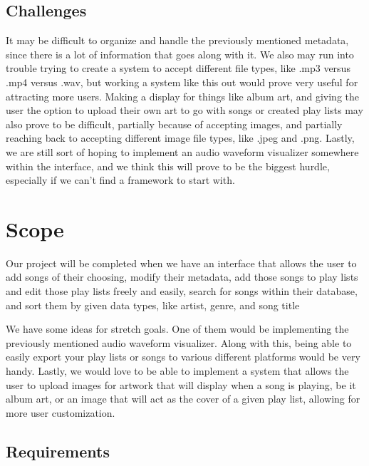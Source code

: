 \documentclass[10pt,conference,onecolumn,compsoc]{IEEEtran}
\begin{document}
\subsection{Challenges}
It may be difficult to organize and handle the previously mentioned metadata, since there is a lot of information that goes along with it. We also may run into trouble trying to create a system to accept different file types, like .mp3 versus .mp4 versus .wav, but working a system like this out would prove very useful for attracting more users. Making a display for things like album art, and giving the user the option to upload their own art to go with songs or created play lists may also prove to be difficult, partially because of accepting images, and partially reaching back to accepting different image file types, like .jpeg and .png. Lastly, we are still sort of hoping to implement an audio waveform visualizer somewhere within the interface, and we think this will prove to be the biggest hurdle, especially if we can't find a framework to start with.


\section{Scope}
Our project will be completed when we have an interface that allows the user to add songs of their choosing, modify their metadata, add those songs to play lists and edit those play lists freely and easily, search for songs within their database, and sort them by given data types, like artist, genre, and song title

We have some ideas for stretch goals. One of them would be implementing the previously mentioned audio waveform visualizer. Along with this, being able to easily export your play lists or songs to various different platforms would be very handy. Lastly, we would love to be able to implement a system that allows the user to upload images for artwork that will display when a song is playing, be it album art, or an image that will act as the cover of a given play list, allowing for more user customization.

\subsection{Requirements}
\end{document}
